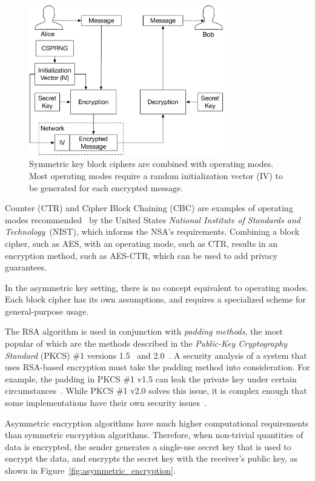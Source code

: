 \begin{figure}[hbt]
  \centering
  \includegraphics[width=85mm]{figures/symmetric_encryption.pdf}
  \caption{
    Symmetric key block ciphers are combined with operating modes. Most
    operating modes require a random initialization vector (IV) to be generated
    for each encrypted message.
  }
  \label{fig:symmetric_encryption}
\end{figure}

Counter (CTR) and Cipher Block Chaining (CBC) are examples of operating modes
recommended~\cite{fips2001ctr} by the United States \textit{National Institute
of Standards and Technology}~(NIST), which informs the NSA's requirements.
Combining a block cipher, such as AES, with an operating mode, such as CTR,
results in an encryption method, such as AES-CTR, which can be used to add
privacy guarantees.

In the asymmetric key setting, there is no concept equivalent to operating
modes. Each block cipher has its own assumptions, and requires a specialized
scheme for general-purpose usage.

The RSA algorithm is used in conjunction with \textit{padding methods}, the
most popular of which are the methods described in the \textit{Public-Key
Cryptography Standard} (PKCS) \#1 versions 1.5~\cite{kaliski1998pkcs1v15} and
2.0~\cite{kaliski1998pkcs1v2}. A security analysis of a system that uses
RSA-based encryption must take the padding method into consideration. For
example, the padding in PKCS \#1 v1.5 can leak the private key under certain
circumstances~\cite{bleichenbacher1998pkcs1v15cca}. While PKCS \#1 v2.0 solves
this issue, it is complex enough that some implementations have their own
security issues~\cite{manger2001pkcs1v20attack}.

Asymmetric encryption algorithms have much higher computational requirements
than symmetric encryption algorithms. Therefore, when non-trivial quantities of
data is encrypted, the sender generates a single-use secret key that is used
to encrypt the data, and encrypts the secret key with the receiver's public
key, as shown in Figure~\ref{fig:asymmetric_encryption}.

